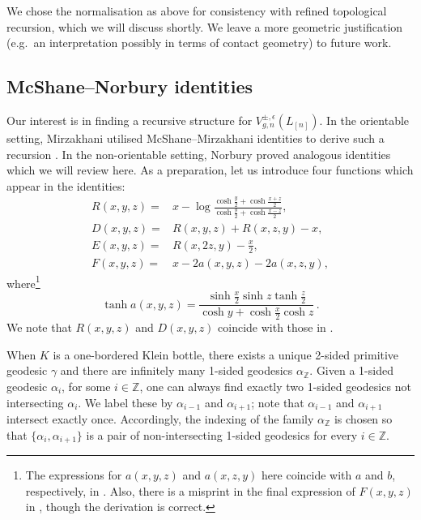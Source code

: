 \documentclass[12pt]{amsart}
\theoremstyle{plain}
\theoremstyle{definition}
\theoremstyle{remark}
\numberwithin{equation}{section}
\begin{document}
We chose the normalisation as above for consistency with refined topological recursion, which we will discuss shortly. We leave a more geometric justification (e.g.~an interpretation possibly in terms of contact geometry) to future work.






\subsection{McShane--Norbury identities}\label{sec:MN identity}
Our interest is in finding a recursive structure for $V_{g,n}^{\pm,\epsilon}(L_{[n]})$. In the orientable setting, Mirzakhani utilised McShane--Mirzakhani identities to derive such a recursion \cite{Mir06}. In the non-orientable setting, Norbury proved analogous identities which we will review here. As a preparation, let us introduce four functions which appear in the identities:
\begin{align}
R(x,y,z)=&x-\log\frac{\cosh\frac{y}{2}+\cosh\frac{x+z}{2}}{\cosh\frac{y}{2}+\cosh\frac{x-z}{2}},\label{R(x,y,z)}\\
D(x,y,z)=&R(x,y,z)+R(x,z,y)-x,\label{D(x,y,z)}\\
E(x,y,z)=&R(x,2z,y)-\frac{x}{2},\label{E(x,y,z)}\\
F(x,y,z)=&x-2a(x,y,z)-2a(x,z,y),\label{F(x,y,z)}
\end{align}
where\footnote{The expressions for $a(x,y,z)$ and $a(x,z,y)$ here coincide with $a$ and $b$, respectively, in \cite{Nor07}. Also, there is a misprint in the final expression of $F(x,y,z)$ in \cite{Nor07}, though the derivation is correct.}
\[\tanh a(x,y,z)=\frac{\sinh\frac{x}{2}\sinh z\tanh\frac{z}{2}}{\cosh y+\cosh\frac{x}{2}\cosh z}\,.\]
We note that $R(x,y,z)$ and $D(x,y,z)$ coincide with those in \cite{Mir06}.

When $K$ is a one-bordered Klein bottle, there exists a unique 2-sided primitive geodesic $\gamma$ and there are infinitely many 1-sided geodesics $\alpha_{\mathbb{Z}}$. Given a 1-sided geodesic $\alpha_i$, for some $i\in\mathbb{Z}$, one can always find exactly two 1-sided geodesics not intersecting $\alpha_i$. We label these by $\alpha_{i-1}$ and $\alpha_{i+1}$; note that $\alpha_{i-1}$ and $\alpha_{i+1}$ intersect exactly once. Accordingly, the indexing of the family $\alpha_{\mathbb{Z}}$ is chosen so that $\{\alpha_i,\alpha_{i+1}\}$ is a pair of non-intersecting 1-sided geodesics for every $i\in\mathbb{Z}$.

\end{document}
